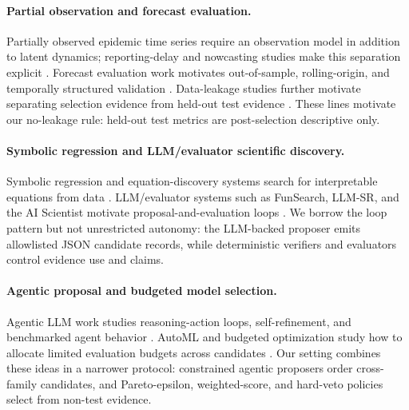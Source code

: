 \paragraph{Partial observation and forecast evaluation.}
Partially observed epidemic time series require an observation model in
addition to latent dynamics; reporting-delay and nowcasting studies make this
separation explicit \cite{king2016pomp,lawless1994reporting,mcgough2020nowcasting}.
Forecast evaluation work motivates out-of-sample, rolling-origin, and
temporally structured validation
\cite{tashman2000outofsample,hyndman2021fpp3,bergmeir2012cv,roberts2017cv}.
Data-leakage studies further motivate separating selection evidence from
held-out test evidence \cite{kaufman2012leakage,kapoor2023leakage}. These
lines motivate our no-leakage rule: held-out test metrics are post-selection
descriptive only.

\paragraph{Symbolic regression and LLM/evaluator scientific discovery.}
Symbolic regression and equation-discovery systems search for interpretable
equations from data
\cite{schmidt2009distilling,brunton2016sindy,udrescu2020aifeynman,
cranmer2023pysr,lacava2021symbolic}. LLM/evaluator systems such as FunSearch,
LLM-SR, and the AI Scientist motivate proposal-and-evaluation loops
\cite{romera2024funsearch,shojaee2024llmsr,lu2024aiscientist}. We borrow the
loop pattern but not unrestricted autonomy: the LLM-backed proposer emits
allowlisted JSON candidate records, while deterministic verifiers and
evaluators control evidence use and claims.

\paragraph{Agentic proposal and budgeted model selection.}
Agentic LLM work studies reasoning-action loops, self-refinement, and
benchmarked agent behavior \cite{yao2023react,madaan2023selfrefine,
liu2023agentbench}. AutoML and budgeted optimization study how to allocate
limited evaluation budgets across candidates
\cite{snoek2012bayesian,feurer2015automl,li2018hyperband,deb2002nsga2}. Our
setting combines these ideas in a narrower protocol: constrained agentic
proposers order cross-family candidates, and Pareto-epsilon, weighted-score,
and hard-veto policies select from non-test evidence.

